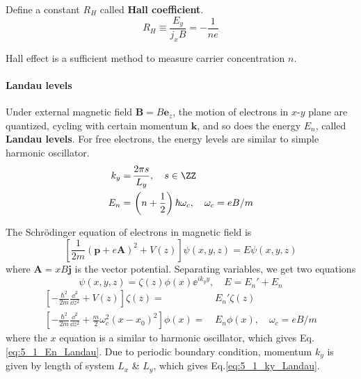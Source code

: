 \documentclass[12pt,a4paper]{article}
\begin{document}
    \begin{prop}
        Define a constant $R_H$ called \textbf{Hall coefficient}.
        \begin{equation}
            R_H \equiv \frac{E_y}{j_x B}
            = - \frac{1}{ne}
        \label{eq:5_1_13_RH}
        \end{equation}
    \end{prop}

    \begin{rem}
        Hall effect is a sufficient method to measure carrier concentration $n$.
    \end{rem}


\paragraph{Landau levels}

    \begin{thm}
        Under external magnetic field $\mathbf{B}=B\mathbf{e}_z$, the motion of electrons in $x$-$y$ plane are quantized, cycling with certain momentum $\mathbf{k}$, and so does the energy $E_n$, called \textbf{Landau levels}. For free electrons, the energy levels are similar to simple harmonic oscillator.
        \begin{align}
        \label{eq:5_1_ky_Landau}
            k_y = &\, \frac{2\pi s}{L_y}, \quad s \in \ZZ \\
        \label{eq:5_1_En_Landau}
            E_n = &\, \left(n+\frac{1}{2}\right) \hbar\omega_c, \quad
            \omega_c = eB/m
        \end{align}
    \end{thm}
    \begin{prf}
        The Schr\"odinger equation of electrons in magnetic field is
        \[ \left[\frac{1}{2m}\left(\mathbf{p}+e\mathbf{A}\right)^2 + V(z)\right] \psi(x,y,z) = E \psi(x,y,z) \]
        where $\mathbf{A}=xB\mathbf{j}$ is the vector potential. Separating variables, we get two equations
        \[ \psi(x,y,z) = \zeta(z) \phi(x) \ee^{ik_yy}, \quad
        E = E_n' + E_n \]
        \[\begin{aligned}
            \left[-\frac{\hbar^2}{2m}\frac{\dd^2}{\dd z^2} + V(z) \right] \zeta(z) = &\, E_n' \zeta(z) \\
            \left[-\frac{\hbar^2}{2m}\frac{\dd^2}{\dd z^2} + \frac{m}{2}\omega_c^2(x-x_0)^2 \right] \phi(x) = &\, E_n \phi(x), \quad
            \omega_c = eB/m
        \end{aligned}\]
        where the $x$ equation is a similar to harmonic oscillator, which gives Eq.\eqref{eq:5_1_En_Landau}. Due to periodic boundary condition, momentum $k_y$ is given by length of system $L_x$ \& $L_y$, which gives Eq.\eqref{eq:5_1_ky_Landau}.
    \end{prf}
\end{document}
